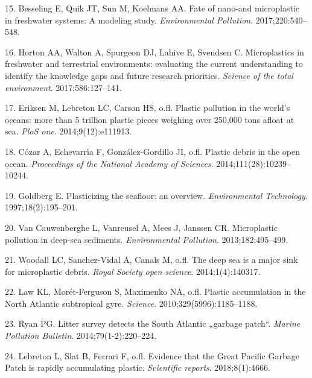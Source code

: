 \documentclass[icelandic,]{book}
\begin{document}
\leavevmode\hypertarget{ref-besseling2017fate}{}%
15. Besseling E, Quik JT, Sun M, Koelmans AA. Fate of nano-and microplastic in freshwater systems: A modeling study. \emph{Environmental Pollution}. 2017;220:540--548.

\leavevmode\hypertarget{ref-horton2017microplastics}{}%
16. Horton AA, Walton A, Spurgeon DJ, Lahive E, Svendsen C. Microplastics in freshwater and terrestrial environments: evaluating the current understanding to identify the knowledge gaps and future research priorities. \emph{Science of the total environment}. 2017;586:127--141.

\leavevmode\hypertarget{ref-eriksen2014plastic}{}%
17. Eriksen M, Lebreton LC, Carson HS, o.fl. Plastic pollution in the world's oceans: more than 5 trillion plastic pieces weighing over 250,000 tons afloat at sea. \emph{PloS one}. 2014;9(12):e111913.

\leavevmode\hypertarget{ref-cozar2014plastic}{}%
18. Cózar A, Echevarrı́a F, González-Gordillo JI, o.fl. Plastic debris in the open ocean. \emph{Proceedings of the National Academy of Sciences}. 2014;111(28):10239--10244.

\leavevmode\hypertarget{ref-goldberg1997plasticizing}{}%
19. Goldberg E. Plasticizing the seafloor: an overview. \emph{Environmental Technology}. 1997;18(2):195--201.

\leavevmode\hypertarget{ref-van2013microplastic}{}%
20. Van Cauwenberghe L, Vanreusel A, Mees J, Janssen CR. Microplastic pollution in deep-sea sediments. \emph{Environmental Pollution}. 2013;182:495--499.

\leavevmode\hypertarget{ref-woodall2014deep}{}%
21. Woodall LC, Sanchez-Vidal A, Canals M, o.fl. The deep sea is a major sink for microplastic debris. \emph{Royal Society open science}. 2014;1(4):140317.

\leavevmode\hypertarget{ref-law2010plastic}{}%
22. Law KL, Morét-Ferguson S, Maximenko NA, o.fl. Plastic accumulation in the North Atlantic subtropical gyre. \emph{Science}. 2010;329(5996):1185--1188.

\leavevmode\hypertarget{ref-ryan2014litter}{}%
23. Ryan PG. Litter survey detects the South Atlantic „garbage patch``. \emph{Marine Pollution Bulletin}. 2014;79(1-2):220--224.

\leavevmode\hypertarget{ref-lebreton2018evidence}{}%
24. Lebreton L, Slat B, Ferrari F, o.fl. Evidence that the Great Pacific Garbage Patch is rapidly accumulating plastic. \emph{Scientific reports}. 2018;8(1):4666.
\end{document}
